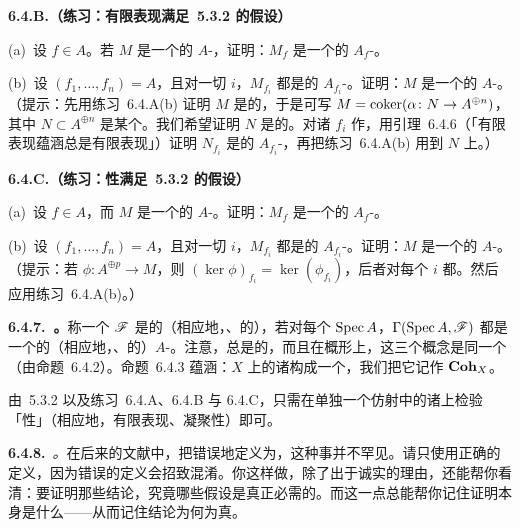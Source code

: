 \textbf{6.4.B.（练习：有限表现满足\trAffineCommunicationLemma{}~5.3.2 的假设）}\quad

(a)~设 $f\in A$。若 $M$ 是一个\trFinitelyPresented{}的 $A$-\trModule，证明：$M_f$ 是一个\trFinitelyPresented{}的 $A_f$-\trModule。

(b)~设 $(f_1,\dots,f_n)=A$，且对一切 $i$，$M_{f_i}$ 都是\trFinitelyPresented{}的 $A_{f_i}$-\trModule。证明：$M$ 是一个\trFinitelyPresented{}的 $A$-\trModule。（提示：先用练习~6.4.A(b) 证明 $M$ 是\trFinitelyGenerated{}的，于是可写 $M=\operatorname{coker}(\alpha\colon N\to A^{\oplus n})$，其中 $N\subset A^{\oplus n}$ 是某个\trSubmodule。我们希望证明 $N$ 是\trFinitelyGenerated{}的。对诸 $f_i$ 作\trLocalization，用引理~6.4.6（「有限表现蕴涵总是有限表现」）证明 $N_{f_i}$ 是\trFinitelyGenerated{}的 $A_{f_i}$-\trModule，再把练习~6.4.A(b) 用到 $N$ 上。）

\textbf{6.4.C.（练习：\trCoh{}性满足\trAffineCommunicationLemma{}~5.3.2 的假设）}\quad

(a)~设 $f\in A$，而 $M$ 是一个\trCoh{}的 $A$-\trModule。证明：$M_f$ 是一个\trCoh{}的 $A_f$-\trModule。

(b)~设 $(f_1,\dots,f_n)=A$，且对一切 $i$，$M_{f_i}$ 都是\trCoh{}的 $A_{f_i}$-\trModule。证明：$M$ 是一个\trCoh{}的 $A$-\trModule。（提示：若 $\phi\colon A^{\oplus p}\to M$，则 $(\ker\phi)_{f_i}=\ker(\phi_{f_i})$，后者对每个 $i$ 都\trFinitelyGenerated。然后应用练习~6.4.A(b)。）

\textbf{6.4.7.\ \trhDefinition{}。}\quad 称一个\trQCSheaf{} $\mathscr{F}$ 是\textbf{\trFiniteType}的（相应地，\textbf{\trFinitelyPresented}、\textbf{\trCoh}的），若对每个\trAffine\trOpenSet{} $\operatorname{Spec} A$，$\Gamma(\operatorname{Spec} A,\mathscr{F})$ 都是一个\trFinitelyGenerated{}的（相应地，\trFinitelyPresented、\trCoh{}的）$A$-\trModule。注意，\trCoherentSheaf{}总是\trFiniteType{}的，而且在\trLocally\trNoetherian{}概形上，这三个概念是同一个（由命题~6.4.2）。命题~6.4.3 蕴涵：$X$ 上的诸\trCoherentSheaf{}构成一个\trAbelianCategory，我们把它记作 $\mathbf{Coh}_X$。

由\trAffineCommunicationLemma{}~5.3.2 以及练习~6.4.A、6.4.B 与 6.4.C，只需在单独一个仿射\trCover{}中的诸\trOpenSet{}上检验「\trFiniteType{}性」（相应地，有限表现、凝聚性）即可。

\textbf{6.4.8.}\ \emph{\trhWarning{}。}\quad 在后来的文献中，把\trCoh{}错误地定义为\trFinitelyGenerated，这种事并不罕见。请只使用正确的定义，因为错误的定义会招致混淆。你这样做，除了出于诚实的理由，还能帮你看清：要证明那些结论，究竟哪些假设是真正必需的。而这一点总能帮你记住证明本身是什么——从而记住结论为何为真。

